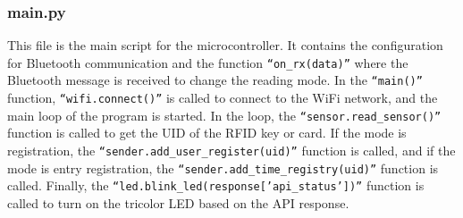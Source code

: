 \documentclass{article}
\begin{document}
\subsubsection{main.py}
This file is the main script for the microcontroller. It contains the configuration for Bluetooth communication and the function \texttt{``on\_rx(data)''} where the Bluetooth message is received to change the reading mode.
In the \texttt{``main()''} function, \texttt{``wifi.connect()''} is called to connect to the WiFi network, and the main loop of the program is started.
In the loop, the \texttt{``sensor.read\_sensor()''} function is called to get the UID of the RFID key or card.
If the mode is registration, the \texttt{``sender.add\_user\_register(uid)''} function is called, and if the mode is entry registration, the \texttt{``sender.add\_time\_registry(uid)''} function is called.
Finally, the \texttt{``led.blink\_led(response['api\_status'])''} function is called to turn on the tricolor LED based on the API response.
\end{document}
